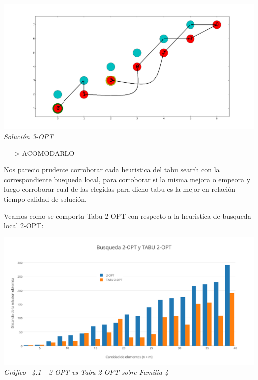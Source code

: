 \vspace*{0.3cm} \vspace*{0.3cm}
  \begin{center}
 \includegraphics[scale=0.3]{./EJ4/fam43opt.png}\\
 {            \textit{Soluci\'on 3-OPT}}
  \end{center}
  \vspace*{0.3cm}

-----> ACOMODARLO

Nos parecio prudente corroborar cada heuristica del tabu search con la correspondiente busqueda local, para corroborar si la misma mejora o empeora y luego corroborar cual de las elegidas para dicho tabu es la mejor en relaci\'on tiempo-calidad de soluci\'on.

Veamos como se comporta Tabu 2-OPT con respecto a la heuristica de busqueda local 2-OPT:

\vspace*{0.3cm} \vspace*{0.3cm}
  \begin{center}
 \includegraphics[scale=0.5]{./EJ4/comparativogym02opt.png}\\
 {            \textit{Gráfico \ 4.1 - 2-OPT vs Tabu 2-OPT sobre Familia 4}}
  \end{center}
  \vspace*{0.3cm}

